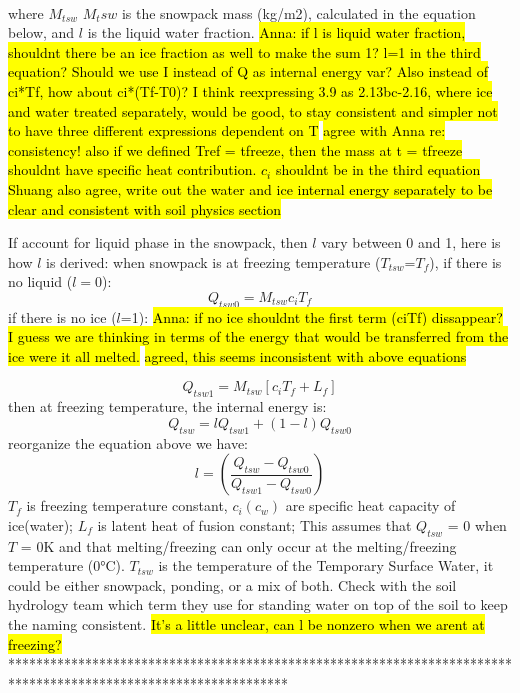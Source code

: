 \documentclass{article}
\begin{document}
\\
where $M_{tsw}$ $M_tsw$ is the snowpack mass (kg/m2), calculated in the equation below, and $l$ is the liquid water fraction. \hl{Anna: if l is liquid water fraction, shouldnt there be an ice fraction as well to make the sum 1? l=1 in the third equation? Should we use I instead of Q as internal energy var? Also instead of ci*Tf, how about ci*(Tf-T0)? I think reexpressing 3.9 as 2.13bc-2.16, where ice and water treated separately, would be good, to stay consistent and simpler not to have three different expressions dependent on T }
\hl{agree with Anna re: consistency! also if we defined Tref = tfreeze, then the mass at t = tfreeze shouldnt have specific heat contribution. $c_i$ shouldnt be in the third equation}
\hl{Shuang also agree, write out the water and ice internal energy separately to be clear and consistent with soil physics section}

If account for liquid phase in the snowpack, then  $l$ vary between 0 and 1, here is how $l$ is derived:  
when snowpack is at freezing temperature ($T_{tsw}$=$T_f$), 
if there is no liquid ($l=0$):
\begin{equation}
Q_{tsw0} = M_{tsw}c_i  T_{f} 
\end{equation}if there is no ice ($l$=1): \hl{Anna: if no ice shouldnt the first term (ciTf) dissappear? I guess we are thinking in terms of the energy that would be transferred from the ice were it all melted.}
\hl{agreed, this seems inconsistent with above equations}

\begin{equation}
Q_{tsw1} = M_{tsw}[c_iT_f+L_f]
\end{equation}
then at freezing temperature, the internal energy is:
\begin{equation}
Q_{tsw} = lQ_{tsw1}+(1-l)Q_{tsw0}
\end{equation}
reorganize the equation above we have:
\begin{equation}
l = (\frac{Q_{tsw}-Q_{tsw0}}{Q_{tsw1}-Q_{tsw0}})
\end{equation}
$T_f$ is freezing temperature constant, $c_i(c_w)$ are specific heat capacity of ice(water); $L_f$ is latent heat of fusion constant; This assumes that $Q_{tsw}$ = 0 when $T$ = 0K and that melting/freezing can only occur at the melting/freezing temperature (0°C). $T_{tsw}$ is the temperature of the Temporary Surface Water, it could be either snowpack, ponding, or a mix of both. Check with the soil hydrology team which term they use for standing water on top of the soil to keep the naming consistent.
\hl{It's a little unclear, can l be nonzero when we arent at freezing?}
****************************************************************************************************************
\end{document}
